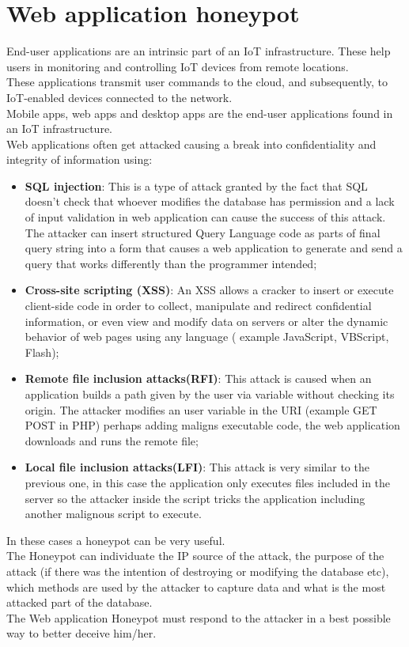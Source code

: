 \section{Web application honeypot}
End-user applications are an intrinsic part of an IoT infrastructure. These help users in monitoring and controlling IoT devices from remote locations.\\
These applications transmit user commands to the cloud, and subsequently, to IoT-enabled devices connected to the network.\\
Mobile apps, web apps and desktop apps are the end-user applications found in an IoT infrastructure.\\
Web applications often get attacked causing a break into confidentiality and integrity of information using: 
\begin{itemize}
    \item \textbf{SQL injection}: This is a type of attack granted by the fact that SQL doesn't check that whoever modifies the database has permission and a lack of input validation in web application can cause the success of this attack. The attacker can insert structured Query Language code as parts of final query string into a form that causes a web application to generate and send a query that works differently than the programmer intended;
    \item \textbf{Cross-site scripting (XSS)}: An XSS allows a cracker to insert or execute client-side code in order to collect, manipulate and redirect confidential information, or even view and modify data on servers or alter the dynamic behavior of web pages using any language ( example JavaScript, VBScript, Flash);
    \item \textbf{Remote file inclusion attacks(RFI)}: This attack is caused when an application builds a path given by the user via variable without checking its origin. The attacker modifies an user variable in the URI (example GET POST in PHP) perhaps adding maligns executable code, the web application downloads and runs the remote file;
    \item \textbf{Local file inclusion attacks(LFI)}: This attack is very similar to the previous one, in this case the application only executes files included in the server so the attacker inside the script tricks the application including another malignous script to execute.
\end{itemize}
In these cases a honeypot can be very useful.\\
The Honeypot can individuate the IP source of the attack, the purpose of the attack (if there was the intention of destroying or modifying the database etc), which methods are used by the attacker to capture data and what is the most attacked part of the database.\\
The Web application Honeypot must respond to the attacker in a best possible way to better deceive him/her.
